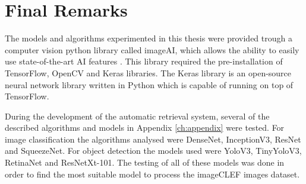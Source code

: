 \section{Final Remarks}


The models and algorithms experimented in this thesis were provided trough a computer vision python library called imageAI, which allows the ability to easily use state-of-the-art AI features \cite{ImageAI}. This library required the pre-installation of TensorFlow, OpenCV and Keras libraries. The Keras library \cite{CholletFrancois2015} is an open-source neural network library written in Python which is capable of running on top of TensorFlow.

During the development of the automatic retrieval system, several of the described algorithms and models in Appendix \ref{ch:appendix} were tested. For image classification the algorithms analysed were DenseNet, InceptionV3, ResNet and SqueezeNet. For object detection the models used were YoloV3, TinyYoloV3, RetinaNet and ResNetXt-101. The testing of all of these models was done in order to find the most suitable model to process the imageCLEF images dataset.